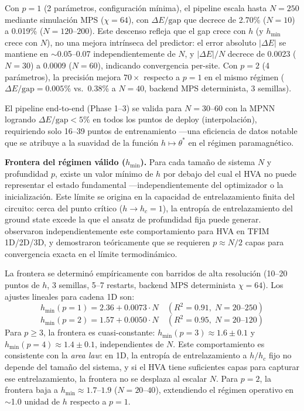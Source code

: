\documentclass[11pt,a4paper,spanish]{book}
\begin{document}
Con $p = 1$ (2 parámetros, configuración mínima), el pipeline escala hasta $N = 250$ mediante simulación MPS ($\chi = 64$), con $\Delta E/\text{gap}$ que decrece de 2.70\% ($N = 10$) a 0.019\% ($N = 120$--$200$). Este descenso refleja que el gap crece con $h$ (y $h_{\min}$ crece con $N$), no una mejora intrínseca del predictor: el error absoluto $|\Delta E|$ se mantiene en $\sim$0.05--0.07 independientemente de $N$, y $|\Delta E|/N$ decrece de 0.0023 ($N = 30$) a 0.0009 ($N = 60$), indicando convergencia per-site. Con $p = 2$ (4 parámetros), la precisión mejora $70\times$ respecto a $p = 1$ en el mismo régimen ($\Delta E/\text{gap} = 0.005\%$ vs.\ 0.38\% a $N = 40$, backend MPS determinista, 3 semillas).

El pipeline end-to-end (Phase 1--3) se valida para $N = 30$--$60$ con la MPNN logrando $\Delta E/\text{gap} < 5\%$ en todos los puntos de deploy (interpolación), requiriendo solo 16--39 puntos de entrenamiento ---una eficiencia de datos notable que se atribuye a la suavidad de la función $h \mapsto \theta^*$ en el régimen paramagnético.

\textbf{Frontera del régimen válido ($h_{\min}$).} Para cada tamaño de sistema $N$ y profundidad $p$, existe un valor mínimo de $h$ por debajo del cual el HVA no puede representar el estado fundamental ---independientemente del optimizador o la inicialización. Este límite se origina en la capacidad de entrelazamiento finita del circuito: cerca del punto crítico ($h \to h_c = 1$), la entropía de entrelazamiento del ground state excede la que el ansatz de profundidad fija puede generar. \citet{tripathi2026} observaron independientemente este comportamiento para HVA en TFIM 1D/2D/3D, y \citet{sumeet2025} demostraron teóricamente que se requieren $p \approx N/2$ capas para convergencia exacta en el límite termodinámico.

La frontera se determinó empíricamente con barridos de alta resolución (10--20 puntos de $h$, 3 semillas, 5--7 restarts, backend MPS determinista $\chi = 64$). Los ajustes lineales para cadena 1D son:
\begin{equation}
h_{\min}(p{=}1) = 2.36 + 0.0073 \cdot N \quad (R^2 = 0.91, \; N = 20\text{--}250)
\label{eq:frontier_p1}
\end{equation}
\begin{equation}
h_{\min}(p{=}2) = 1.57 + 0.0050 \cdot N \quad (R^2 = 0.95, \; N = 20\text{--}120)
\label{eq:frontier_p2}
\end{equation}
Para $p \geq 3$, la frontera es cuasi-constante: $h_{\min}(p{=}3) \approx 1.6 \pm 0.1$ y $h_{\min}(p{=}4) \approx 1.4 \pm 0.1$, independientes de $N$. Este comportamiento es consistente con la \emph{area law}: en 1D, la entropía de entrelazamiento a $h/h_c$ fijo no depende del tamaño del sistema, y si el HVA tiene suficientes capas para capturar ese entrelazamiento, la frontera no se desplaza al escalar $N$. Para $p = 2$, la frontera baja a $h_{\min} \approx 1.7$--$1.9$ ($N = 20$--$40$), extendiendo el régimen operativo en $\sim$1.0 unidad de $h$ respecto a $p = 1$.
\end{document}
